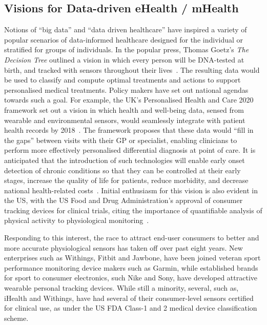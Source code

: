 \documentclass{sigchi}
\begin{document}
\subsection{Visions for Data-driven eHealth / mHealth}
Notions of ``big data'' and ``data driven healthcare'' have inspired a variety of popular scenarios  of data-informed healthcare designed for the individual or stratified for groups of individuals. In the popular press, Thomas Goetz's \emph{The Decision Tree} outlined a vision in which every person will be DNA-tested at birth, and tracked with sensors throughout their lives~\cite{goetz_decision_2011}. The resulting data would be used to classify and compute optimal treatments and actions to support personalised medical treatments. Policy makers have set out national agendas towards such a goal. For example, the UK's Personalised Health and Care 2020 framework set out a vision in which health and well-being data, sensed from wearable and environmental sensors, would seamlessly integrate with patient health records by 2018~\cite{Personalised2014}.  The framework proposes that these data would ``fill in the gaps'' between visits with their GP or specialist, enabling clinicians to perform more effectively personalised differential diagnosis at point of care.  It is anticipated that the introduction of such technologies will enable early onset detection of chronic conditions so that they can be controlled at their early stages, increase the quality of life for patients, reduce morbidity, and decrease national health-related costs~\cite{Swan2009}.   Initial enthusiasm for this vision is also evident in the US, with the US Food and Drug Administration's approval of  consumer tracking devices for clinical trials, citing the importance of quantifiable analysis of physical activity to physiological monitoring~\cite{U.S.FoodandDrugAdministration2014}. %



Responding to this interest, the race to attract end-user consumers to better and more accurate physiological sensors has taken off over past eight years. New enterprises such as Withings, Fitbit and Jawbone, have been joined veteran sport performance monitoring device makers such as Garmin, while established brands for sport to consumer electronics, such Nike and Sony, have developed attractive wearable personal tracking devices.  While still a minority, several, such as, iHealth and Withings, have had several of their consumer-level sensors certified for clinical use, as under the US FDA Class-1 and 2 medical device classification scheme. 
\end{document}
